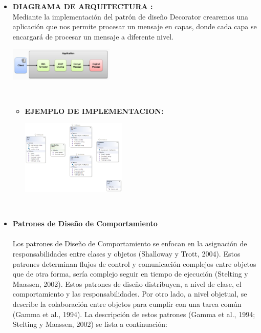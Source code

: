 \documentclass[twoside,twocolumn]{article}
\begin{document}
\begin{itemize}
	\item \textbf{DIAGRAMA DE ARQUITECTURA :}	\\
        Mediante la implementación del patrón de diseño Decorator crearemos una aplicación que nos permite procesar un mensaje en capas, donde cada capa se encargará de procesar un mensaje a diferente nivel.
        
        \begin{center}
            \includegraphics[width=5cm]{./img/Imagen7.png} 
        \end{center}
        \\

        \begin{itemize}
        \item \textbf{EJEMPLO DE IMPLEMENTACION:}	
        
        \begin{center}
            \includegraphics[width=5cm]{./img/Imagen8.png} 
        \end{center}
        \\

        \end{itemize} 

	
    \item \textbf{Patrones de Diseño de Comportamiento }
	\\
	\\Los patrones de Diseño de Comportamiento se enfocan en la asignación de responsabilidades entre clases y objetos (Shalloway y Trott, 2004). 
    Estos patrones determinan flujos de control y comunicación complejos entre objetos que de otra forma, sería complejo seguir en tiempo de ejecución (Stelting y Maassen, 2002). Estos patrones de diseño distribuyen, a nivel de clase, el comportamiento y las responsabilidades. Por otro lado, a nivel objetual, se describe la colaboración entre objetos para cumplir con una tarea común (Gamma et al., 1994). La descripción de estos patrones (Gamma et al., 1994; Stelting y Maassen, 2002) se lista a continuación:
    

\end{itemize}
\end{document}
